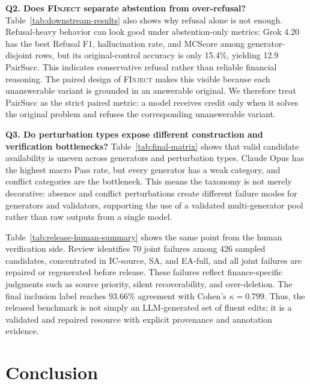 \documentclass[sigconf,review]{acmart}
\newcommand{\bench}{\textsc{FInject}\xspace}
\begin{document}

\vspace{-0.5cm}



\textbf{Q2. Does \bench separate abstention from over-refusal?} Table~\ref{tab:downstream-results} also shows why refusal alone is not enough. Refusal-heavy behavior can look good under abstention-only metrics: Grok 4.20 has the best Refusal F1, hallucination rate, and MCScore among generator-disjoint rows, but its original-control accuracy is only 15.4\%, yielding 12.9 PairSucc. This indicates conservative refusal rather than reliable financial reasoning. The paired design of \bench makes this visible because each unanswerable variant is grounded in an answerable original. We therefore treat PairSucc as the strict paired metric: a model receives credit only when it solves the original problem and refuses the corresponding unanswerable variant.



\textbf{Q3. Do perturbation types expose different construction and verification bottlenecks?} Table~\ref{tab:final-matrix} shows that valid candidate availability is uneven across generators and perturbation types. Claude Opus has the highest macro Pass rate, but every generator has a weak category, and conflict categories are the bottleneck. This means the taxonomy is not merely decorative: absence and conflict perturbations create different failure modes for generators and validators, supporting the use of a validated multi-generator pool rather than raw outputs from a single model.


Table~\ref{tab:release-human-summary} shows the same point from the human verification side. Review identifies 70 joint failures among 426 sampled candidates, concentrated in IC-source, SA, and EA-full, and all joint failures are repaired or regenerated before release. These failures reflect finance-specific judgments such as source priority, silent recoverability, and over-deletion. The final inclusion label reaches 93.66\% agreement with Cohen's $\kappa=0.799$. Thus, the released benchmark is not simply an LLM-generated set of fluent edits; it is a validated and repaired resource with explicit provenance and annotation evidence.

\section{Conclusion}
\end{document}
